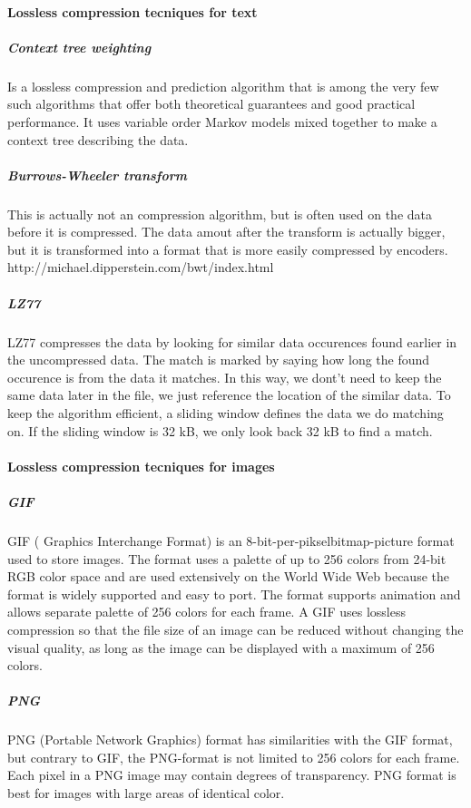 \paragraph{Lossless compression tecniques for text}

\subparagraph{Context tree weighting}
Is a lossless compression and prediction algorithm that is among the very few such algorithms that offer both theoretical guarantees and good practical performance. It uses variable order Markov models mixed together to make a context tree describing the data. \cite{bib:contextTreeWeighting} \cite{bib:contextTreeWeightingResearch}

\subparagraph{Burrows-Wheeler transform } 
This is actually not an compression algorithm, but is often used on the data before it is compressed. The data amout after the transform is actually bigger, but it is transformed into a format that is more easily compressed by encoders. http://michael.dipperstein.com/bwt/index.html
\cite{bib:burrowsWheelerTransform}

\subparagraph{LZ77}
LZ77 compresses the data by looking for similar data occurences found earlier in the uncompressed data. The match is marked by saying how long the found occurence is from the data it matches. In this way, we dont't need to keep the same data later in the file, we just reference the location of the similar data. To keep the algorithm efficient, a sliding window defines the data we do matching on. If the sliding window is 32 kB, we only look back 32 kB to find a match.
\cite{bib:LZ77}

\paragraph{Lossless compression tecniques for images}
\subparagraph{GIF}
GIF ( Graphics Interchange Format) is an 8-bit-per-pikselbitmap-picture format used to store images. The format uses a palette of up to 256 colors from 24-bit RGB color space and are used extensively on the World Wide Web because the format is widely supported and easy to port. The format supports animation and allows separate palette of 256 colors for each frame. A GIF uses lossless compression so that the file size of an image can be reduced without changing the visual quality, as long as the image can be displayed with a maximum of 256 colors. \cite{bib:GIF} \cite{bib:gifSicle}

\subparagraph{PNG}
PNG (Portable Network Graphics) format has similarities with the GIF format, but contrary to GIF, the PNG-format is not limited to 256 colors for each frame. Each pixel in a PNG image may contain degrees of transparency. PNG format is best for images with large areas of identical color. \cite{bib:PNG}

